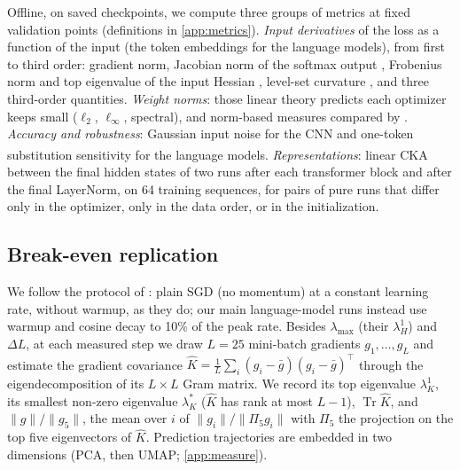 \documentclass[10pt]{article}
\newcommand{\extra}{\textsuperscript{\dag}}  %
\newcommand{\lmax}{\lambda_{\max}}
\begin{document}
Offline, on saved checkpoints, we compute three groups of metrics at fixed validation points (definitions in
\cref{app:metrics}). \emph{Input derivatives} of the loss as a function of the input (the token embeddings
for the language models), from first to third order: gradient norm, Jacobian norm of the softmax output
\citep{novak2018sensitivity}, Frobenius norm and top eigenvalue of the input Hessian
\citep{moosavi2019cure}, level-set curvature \citep{srinivas2022lowcurv}, and three third-order
quantities. \emph{Weight norms}: those linear theory predicts each optimizer keeps small ($\ell_2$,
$\ell_\infty$, spectral), and norm-based measures compared by \citet{jiang2020fantastic}. \emph{Accuracy and
robustness}: Gaussian input noise for the CNN \citep{ford2019noise} and one-token substitution sensitivity
\citep{hahn2021sensitivity} for the language models. \emph{Representations}\extra: linear CKA
\citep{kornblith2019cka} between the final hidden states of two runs after each transformer block and after the
final LayerNorm, on 64 training sequences, for pairs of pure runs that differ only in the optimizer, only in the
data order, or in the initialization.

\subsection{Break-even replication}
\label{sec:method-breakeven}

We follow the protocol of \citet{jastrzebski2020breakeven}: plain SGD (no momentum) at a constant learning
rate, without warmup, as they do; our main language-model runs instead use warmup and cosine decay to 10\% of the
peak rate. Besides $\lmax$ (their $\lambda_H^1$) and $\Delta L$, at each measured step we draw
$L=25$ mini-batch gradients $g_1,\dots,g_L$ and estimate the gradient covariance
$\hat K=\frac1L\sum_i(g_i-\bar g)(g_i-\bar g)^\top$ through the eigendecomposition of its $L\times L$ Gram
matrix. We record its top eigenvalue $\lambda_K^1$, its smallest non-zero eigenvalue $\lambda_K^\ast$
($\hat K$ has rank at most $L-1$), $\operatorname{Tr}\hat K$, and $\|g\|/\|g_5\|$, the mean over $i$ of
$\|g_i\|/\|\Pi_5g_i\|$ with $\Pi_5$ the projection on the top five eigenvectors of $\hat K$. Prediction
trajectories are embedded in two dimensions (PCA, then UMAP; \cref{app:measure}).
\end{document}
